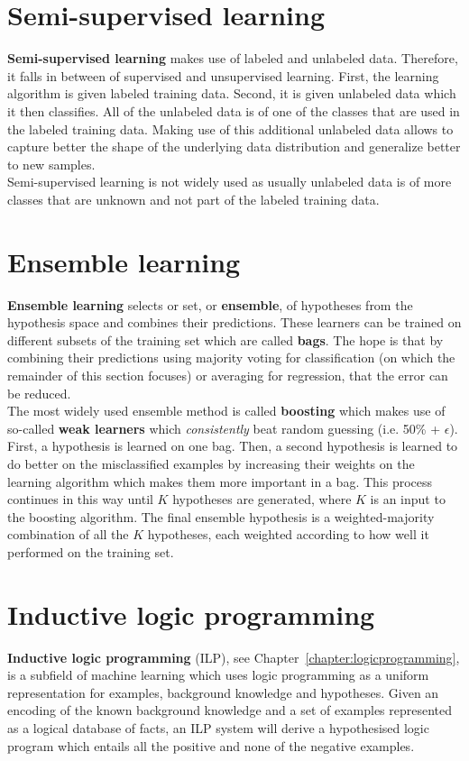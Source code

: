 \documentclass{report}
\begin{document}
\section{Semi-supervised learning}
{\bf Semi-supervised learning} makes use of labeled and unlabeled data.
Therefore, it falls in between of supervised and unsupervised learning.
First, the learning algorithm is given labeled training data. Second, it is given unlabeled data which it then classifies.
All of the unlabeled data is of one of the classes that are used in the labeled training data.
Making use of this additional unlabeled data allows to capture better the shape of the underlying data distribution and generalize better to new samples. \\
Semi-supervised learning is not widely used as usually unlabeled data is of more classes that are unknown and not part of the labeled training data.

\section{Ensemble learning}
{\bf Ensemble learning} selects or set, or {\bf ensemble}, of hypotheses from the hypothesis space and combines their predictions.
These learners can be trained on different subsets of the training set which are called {\bf bags}.
The hope is that by combining their predictions using majority voting for classification (on which the remainder of this section focuses) or averaging for regression, that the error can be reduced.
\\
The most widely used ensemble method is called {\bf boosting} which makes use of so-called {\bf weak learners} which {\em consistently} beat random guessing (i.e. 50\% + $\epsilon$).
First, a hypothesis is learned on one bag.
Then, a second hypothesis is learned to do better on the misclassified examples by increasing their weights on the learning algorithm which makes them more important in a bag.
This process continues in this way until $K$ hypotheses are generated, where $K$ is an input to the boosting algorithm.
The final ensemble hypothesis is a weighted-majority combination of all the $K$ hypotheses, each weighted according to how well it performed on the training set.

\section{Inductive logic programming}
{\bf Inductive logic programming} (ILP), see Chapter~\ref{chapter:logicprogramming}, is a subfield of machine learning which uses logic programming as a uniform representation for examples, background knowledge and hypotheses.
Given an encoding of the known background knowledge and a set of examples represented as a logical database of facts, an ILP system will derive a hypothesised logic program which entails all the positive and none of the negative examples.
\end{document}
